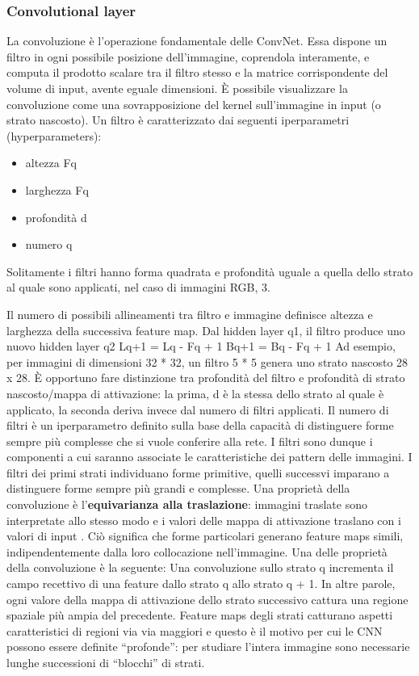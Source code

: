 \documentclass[14pt]{extarticle}
\begin{document}
\subsubsection{Convolutional layer}
La convoluzione è l’operazione fondamentale delle ConvNet. Essa dispone un filtro in ogni possibile posizione dell’immagine, coprendola interamente, e computa il prodotto scalare tra il filtro stesso e la matrice corrispondente del volume di input, avente
eguale dimensioni. È possibile visualizzare la convoluzione come una sovrapposizione del kernel sull’immagine in input (o strato nascosto). \cite{aggarwal2018neural} 
Un filtro è caratterizzato dai
seguenti iperparametri (hyperparameters):
\begin{itemize}
\item altezza Fq
\item larghezza Fq
\item profondità d
\item numero q
\end{itemize}
Solitamente i filtri hanno forma quadrata e profondità uguale a quella dello strato al
quale sono applicati, nel caso di immagini RGB, 3.  
Il numero di possibili allineamenti tra filtro e immagine definisce altezza e larghezza della successiva feature
map.
Dal hidden layer q1, il filtro produce uno nuovo hidden layer q2
Lq+1 = Lq - Fq + 1
Bq+1 = Bq - Fq + 1
Ad esempio, per immagini di dimensioni 32 * 32, un filtro 5 * 5 genera uno strato
nascosto 28 x 28.
È opportuno fare distinzione tra profondità del filtro e profondità di strato nascosto/mappa di attivazione: la prima, d è la stessa dello strato al quale è applicato, la
seconda deriva invece dal numero di filtri applicati. Il numero di filtri è un iperparametro definito sulla base della capacità di distinguere forme sempre più complesse che
si vuole conferire alla rete. I filtri sono dunque i componenti a cui saranno associate le
caratteristiche dei pattern delle immagini.
I filtri dei primi strati individuano forme primitive, quelli successvi imparano a distinguere forme sempre più grandi e complesse. Una proprietà della convoluzione è
l’\textbf{equivarianza alla traslazione}: immagini traslate sono interpretate allo stesso modo e
i valori delle mappa di attivazione traslano con i valori di input \cite{torresin2019sviluppo}. Ciò significa che forme particolari generano feature maps simili, indipendentemente dalla loro collocazione
nell’immagine.
Una delle proprietà della convoluzione è la seguente:
Una convoluzione sullo strato q incrementa il campo recettivo di una feature dallo strato q allo strato q + 1. In altre parole, ogni valore della mappa di attivazione dello strato successivo cattura una regione
spaziale più ampia del precedente. Feature maps degli strati catturano aspetti caratteristici di regioni via via maggiori e questo è il motivo per cui le CNN possono essere
definite “profonde”: per studiare l’intera immagine sono necessarie lunghe successioni
di “blocchi” di strati. 
\end{document}
